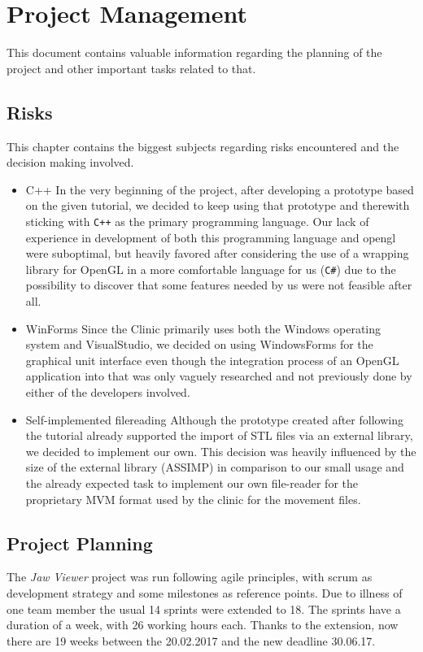 \section{Project Management}
This document contains valuable information regarding the planning of the project and other important tasks related to that.

\subsection{Risks}
This chapter contains the biggest subjects regarding risks encountered and the decision making involved.
\begin{itemize}
	\item C++ \newline
	In the very beginning of the project, after developing a prototype based on the given tutorial, we decided to keep using that prototype and therewith sticking with \verb|C++| as the primary programming language. Our lack of experience in development of both this programming language and \gls{opengl} were suboptimal, but heavily favored after considering the use of a wrapping library for OpenGL in a more comfortable language for us (\verb|C#|) due to the possibility to discover that some features needed by us were not feasible after all.	
	\item WinForms \newline
	Since the Clinic primarily uses both the Windows operating system and VisualStudio, we decided on using WindowsForms for the graphical unit interface even though the integration process of an OpenGL application into that was only vaguely researched and not previously done by either of the developers involved.
	\item Self-implemented filereading \newline
	Although the prototype created after following the tutorial already supported the import of STL files via an external library, we decided to implement our own. This decision was heavily influenced by the size of the external library (ASSIMP) in comparison to our small usage and the already expected task to implement our own file-reader for the proprietary MVM format used by the clinic for the movement files.
\end{itemize}

\subsection{Project Planning}
The \emph{Jaw Viewer} project was run following agile principles, with scrum \cite{scrum} as development strategy and some milestones as reference points. Due to illness of one team member the usual 14 sprints \cite{sprint} were extended to 18. The sprints have a duration of a week, with 26 working hours each. Thanks to the extension, now there are 19 weeks between the 20.02.2017 and the new deadline 30.06.17.

